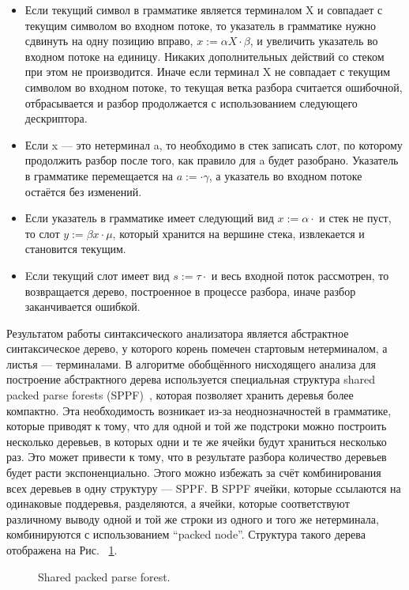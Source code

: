 \begin{itemize}
\item Если текущий символ в грамматике является терминалом X и совпадает с текущим символом во входном потоке, то указатель в грамматике нужно сдвинуть на одну позицию вправо, $x := \alpha X \cdot \beta$, и увеличить указатель во входном потоке на единицу. Никаких дополнительных действий со стеком при этом не производится. Иначе если терминал X не совпадает с текущим символом во входном потоке, то текущая ветка разбора считается ошибочной, отбрасывается и разбор продолжается с использованием следующего дескриптора.
\item Если x --- это нетерминал a, то необходимо в стек записать слот, по которому продолжить разбор после того, как правило для a будет разобрано. Указатель в грамматике перемещается на $a := \cdot \gamma$, а указатель во входном потоке остаётся без изменений.
\item Если указатель в грамматике имеет следующий вид $x := \alpha \cdot$ и стек не пуст, то слот $y := \beta x \cdot \mu$, который хранится на вершине стека, извлекается и становится текущим.
\item Eсли текущий слот имеет вид $s := \tau \cdot$ и весь входной поток рассмотрен, то возвращается дерево, построенное в процессе разбора, иначе разбор заканчивается ошибкой.
\end{itemize}

Результатом работы синтаксического анализатора является абстрактное синтаксическое дерево, у которого корень помечен стартовым нетерминалом, а листья --- терминалами. В алгоритме обобщённого нисходящего анализа для построение абстрактного дерева используется специальная структура shared packed parse forests (SPPF)~\cite{rekers}, которая позволяет хранить деревья более компактно. Эта необходимость возникает из-за неоднозначностей в грамматике, которые приводят к тому, что для одной и той же подстроки можно построить несколько деревьев, в которых одни и те же ячейки будут храниться несколько раз. Это может привести к тому, что в результате разбора количество деревьев будет расти экспоненциально. Этого можно избежать за счёт комбинирования всех деревьев в одну структуру --- SPPF. В SPPF ячейки, которые ссылаются на одинаковые поддеревья, разделяются, а ячейки, которые соответствуют различному выводу одной и той же строки из одного и того же нетерминала, комбинируются с использованием “packed node”. Структура такого дерева отображена на Рис. ~\ref{fig2}. 

\begin{figure}[h]
\caption{Shared packed parse forest.}
\label{fig2}
\end{figure}

